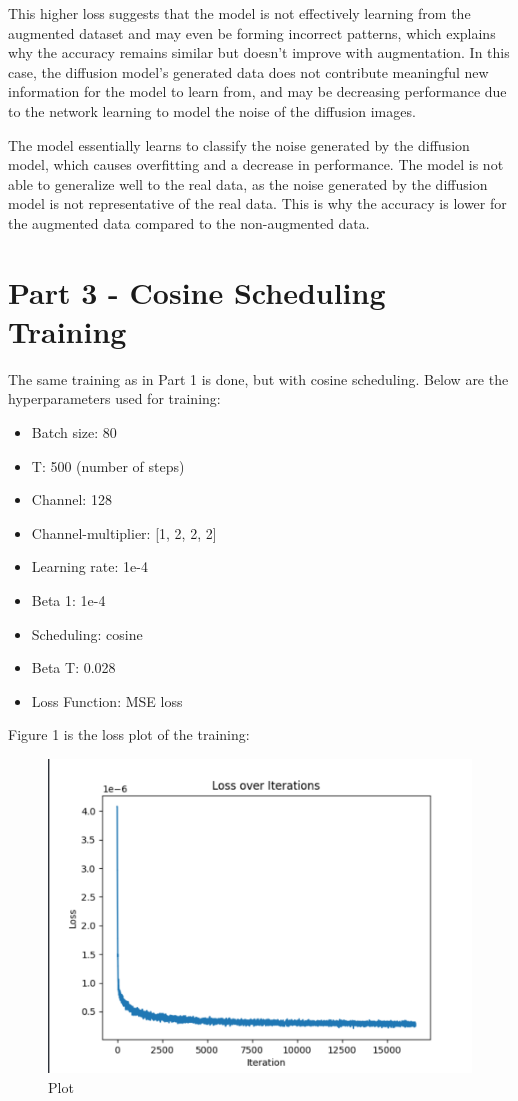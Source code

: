 \documentclass[conference]{IEEEtran}
\begin{document}
This higher loss suggests that the model is not effectively learning from the augmented dataset and may even be forming incorrect patterns, which explains why the accuracy remains similar but doesn't improve with augmentation. In this case, the diffusion model’s generated data does not contribute meaningful new information for the model to learn from, and may be decreasing performance due to the network learning to model the noise of the diffusion images.

The model essentially learns to classify the noise generated by the diffusion model, which causes overfitting and a decrease in performance. The model is not able to generalize well to the real data, as the noise generated by the diffusion model is not representative of the real data. This is why the accuracy is lower for the augmented data compared to the non-augmented data.


\section{Part 3 - Cosine Scheduling Training}
The same training as in Part 1 is done, but with cosine scheduling. Below are the hyperparameters used for training:
\begin{itemize}
  \item Batch size: 80
  \item T: 500 (number of steps)
  \item Channel: 128
  \item Channel-multiplier: [1, 2, 2, 2]
  \item Learning rate: 1e-4
  \item Beta 1: 1e-4
  \item Scheduling: cosine
  \item Beta T: 0.028
  \item Loss Function: MSE loss
\end{itemize}

Figure 1 is the loss plot of the training:
\begin{figure}[!h]
  \centering
  \includegraphics[scale=0.2]{./images/cosineloss.png}
  \caption{Plot}
\end{figure} 
\end{document}
